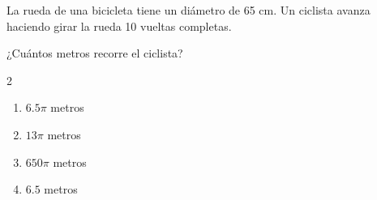 La rueda de una bicicleta tiene un diámetro de 65 cm. Un ciclista avanza haciendo girar la rueda 10 vueltas completas.

¿Cuántos metros recorre el ciclista?

\begin{multicols}{2}
\begin{enumerate}[label=\alph*), leftmargin=*]
\item $6.5\pi$ metros
\item $13\pi$ metros
\item $650\pi$ metros
\item $6.5$ metros
\end{enumerate}
\end{multicols}